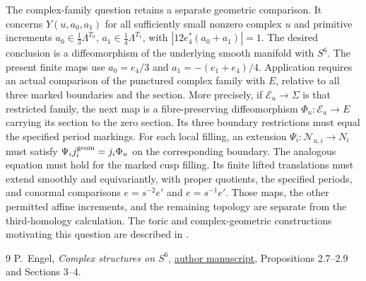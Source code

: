 The complex-family question retains a separate geometric comparison.
It concerns $Y(u,a_0,a_1)$ for all sufficiently small nonzero complex $u$
and primitive increments
$a_0\in\frac13\Lambda^{T_0}$, $a_1\in\frac14\Lambda^{T_1}$,
with $|12e_4^*(a_0+a_1)|=1$.
The desired conclusion is a diffeomorphism of the underlying smooth manifold with $S^6$.
The present finite maps use $a_0=e_4/3$ and $a_1=-(e_1+e_4)/4$.
Application requires an actual comparison of the punctured complex family with $E$,
relative to all three marked boundaries and the section.
More precisely, if $\mathcal E_u\to\Sigma$ is that restricted family,
the next map is a fibre-preserving diffeomorphism
$\Phi_u:\mathcal E_u\to E$ carrying its section to the zero section.
Its three boundary restrictions must equal the specified period markings.
For each local filling, an extension
$\Psi_i:\mathcal N_{u,i}\to N_i$ must satisfy
$\Psi_i j_i^{\rm geom}=j_i\Phi_u$ on the corresponding boundary.
The analogous equation must hold for the marked cusp filling.
Its finite lifted translations must extend smoothly and equivariantly,
with proper quotients, the specified periods, and conormal comparisons
$e=s^{-2}e'$ and $e=s^{-1}e'$.
Those maps, the other permitted affine increments, and the remaining topology
are separate from the third-homology calculation.
The toric and complex-geometric constructions motivating this question are
described in \cite[Sections 2--4]{THengel}.

\begin{thebibliography}{9}
P.~Engel, \emph{Complex structures on $S^6$},
\href{https://philip-engel.github.io/S6.pdf}{author manuscript},
Propositions 2.7--2.9 and Sections 3--4.
\end{thebibliography}
